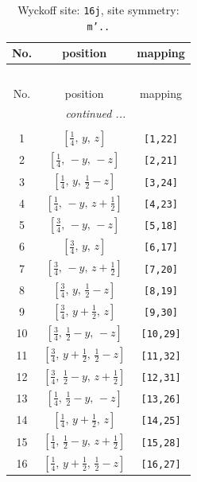 \documentclass[fleqn,8pt]{jsarticle}
\begin{document}
\renewcommand{\arraystretch}{1.2}
\begin{longtable}{ccc}
\caption{Wyckoff site: {\tt 16j}, site symmetry: {\tt m'..}}
 \\
 \hline \hline
No. & position & mapping \\ \hline \endfirsthead

\multicolumn{2}{l}{\tablename\ \thetable{}} \\
 \hline \hline
No. & position & mapping \\ \hline \endhead

 \hline \hline
\multicolumn{2}{r}{\footnotesize\it continued ...} \\ \endfoot

 \hline \hline
\multicolumn{2}{r}{} \\ \endlastfoot

1 & $\left[ \frac{1}{4},\, y,\, z \right]$ & {\tt [1,22]} \\ \hline
2 & $\left[ \frac{1}{4},\, - y,\, - z \right]$ & {\tt [2,21]} \\ \hline
3 & $\left[ \frac{1}{4},\, y,\, \frac{1}{2} - z \right]$ & {\tt [3,24]} \\ \hline
4 & $\left[ \frac{1}{4},\, - y,\, z + \frac{1}{2} \right]$ & {\tt [4,23]} \\ \hline
5 & $\left[ \frac{3}{4},\, - y,\, - z \right]$ & {\tt [5,18]} \\ \hline
6 & $\left[ \frac{3}{4},\, y,\, z \right]$ & {\tt [6,17]} \\ \hline
7 & $\left[ \frac{3}{4},\, - y,\, z + \frac{1}{2} \right]$ & {\tt [7,20]} \\ \hline
8 & $\left[ \frac{3}{4},\, y,\, \frac{1}{2} - z \right]$ & {\tt [8,19]} \\ \hline
9 & $\left[ \frac{3}{4},\, y + \frac{1}{2},\, z \right]$ & {\tt [9,30]} \\ \hline
10 & $\left[ \frac{3}{4},\, \frac{1}{2} - y,\, - z \right]$ & {\tt [10,29]} \\ \hline
11 & $\left[ \frac{3}{4},\, y + \frac{1}{2},\, \frac{1}{2} - z \right]$ & {\tt [11,32]} \\ \hline
12 & $\left[ \frac{3}{4},\, \frac{1}{2} - y,\, z + \frac{1}{2} \right]$ & {\tt [12,31]} \\ \hline
13 & $\left[ \frac{1}{4},\, \frac{1}{2} - y,\, - z \right]$ & {\tt [13,26]} \\ \hline
14 & $\left[ \frac{1}{4},\, y + \frac{1}{2},\, z \right]$ & {\tt [14,25]} \\ \hline
15 & $\left[ \frac{1}{4},\, \frac{1}{2} - y,\, z + \frac{1}{2} \right]$ & {\tt [15,28]} \\ \hline
16 & $\left[ \frac{1}{4},\, y + \frac{1}{2},\, \frac{1}{2} - z \right]$ & {\tt [16,27]} \\
\end{longtable}
\end{document}
